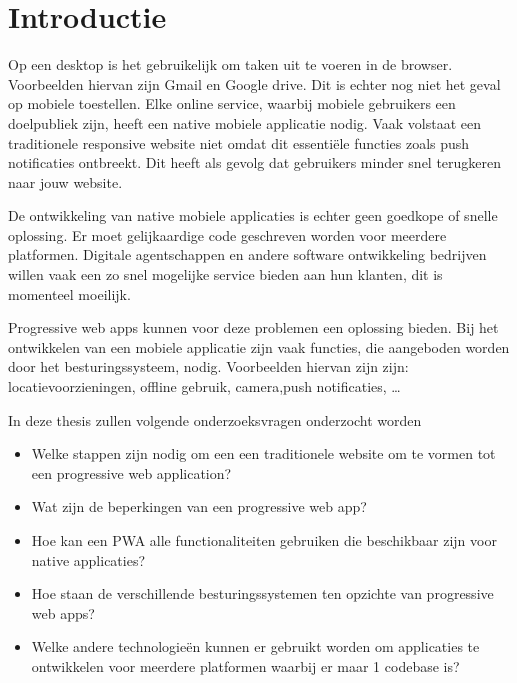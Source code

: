 
\section{Introductie} %
\label{sec:introductie}

Op een desktop is het gebruikelijk om taken uit te voeren in de browser. Voorbeelden hiervan zijn Gmail en Google drive. Dit is echter nog niet het geval op mobiele toestellen.
Elke online service, waarbij mobiele gebruikers een doelpubliek zijn, heeft een native mobiele applicatie nodig. Vaak volstaat een traditionele responsive website niet omdat dit essentiële functies zoals push notificaties ontbreekt. Dit heeft als gevolg dat gebruikers minder snel terugkeren naar jouw website.
\autocite{Hiltunen2018}

De ontwikkeling van native mobiele applicaties is echter geen goedkope of snelle oplossing. Er moet gelijkaardige code geschreven worden voor meerdere platformen. Digitale agentschappen en andere software ontwikkeling bedrijven willen vaak een zo snel mogelijke service bieden aan hun klanten, dit is momenteel moeilijk.

Progressive web apps kunnen voor deze problemen een oplossing bieden.
Bij het ontwikkelen van een mobiele applicatie zijn vaak functies, die aangeboden worden door het besturingssysteem, nodig. Voorbeelden hiervan zijn zijn: locatievoorzieningen, offline gebruik, camera,push notificaties, …

In deze thesis zullen volgende onderzoeksvragen onderzocht worden
\begin{itemize}
    \item Welke stappen zijn nodig om een een traditionele website om te vormen tot een progressive web application?
    \item Wat zijn de beperkingen van een progressive web app?
    \item Hoe kan een PWA alle functionaliteiten gebruiken die beschikbaar zijn voor native applicaties?
    \item Hoe staan de verschillende besturingssystemen ten opzichte van progressive web apps?
    \item Welke andere technologieën kunnen er gebruikt worden om applicaties te ontwikkelen voor meerdere platformen waarbij er maar 1 codebase is?
\end{itemize}

